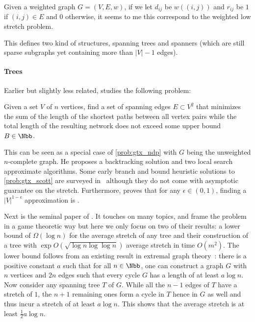 Given a weighted graph $G=(V,E,w)$, if we let $d_{ij}$ be $w((i,j))$ and $r_{ij}$ be $1$ if
$(i,j)\in E$ and $0$ otherwise, it seems to me this correspond to the weighted low stretch problem.

This defines two kind of structures, spanning trees and spanners (which are still sparse subgraphs
yet containing more than $|V|-1$ edges).

\paragraph{Trees}
\label{par:trees}

Earlier but slightly less related, \textcite{OptimalNetwork69} studies the following problem:
\begin{problem}
  \label{prob:gtx_scott}
  Given a set $V$ of $n$ vertices, find a set of spanning edges $E\subset V^2$ that minimizes
  the sum of the length of the shortest paths  between all vertex pairs while the
  total length of the resulting network does not exceed some upper bound $B\in\Nbb$.
\end{problem}
This can be seen as a special case of \autoref{prob:gtx_ndp} with $G$ being the unweighted
 $n$-complete graph. He proposes a backtracking solution and two local search approximate
algorithms. Some early branch and bound heuristic solutions to \autoref{prob:gtx_scott} are surveyed
in~\autocite[Section 2.3.2]{networkDesignSurvey89} although they do not come with asymptotic
guarantee on the stretch. Furthermore, \textcite{optimApproxNP80} proves that for any $\epsilon \in
(0,1)$, finding a $|V|^{1-\epsilon}$ approximation is \NPc{}.

Next is the seminal paper of \textcite{LowerBound95}. It touches on many topics, and frame the
problem in a game theoretic way but here we only focus on two of their results: a lower bound of
$\Omega(\log n)$ for the average stretch of any tree and their construction of a tree with $\exp
O(\sqrt{\log n\log\log n})$ average stretch in time $O(m^2)$. The lower bound follows from an
existing result in extremal graph theory~\autocite[pages 107--109]{ExtremalGraph04}: there is a
positive constant $a$ such that for all $n\in \Nbb$, one can construct a graph $G$ with $n$ vertices
and $2n$ edges such that every cycle $G$ has a length of at least $a\log n$. Now consider any
spanning tree $T$ of $G$.  While all the $n-1$ edges of $T$ have a stretch of $1$, the $n+1$
remaining ones form a cycle in $T$ hence in $G$ as well and thus incur a stretch of at least $a\log
n$. This shows that the average stretch is at least $\frac{1}{2}a\log n$.

